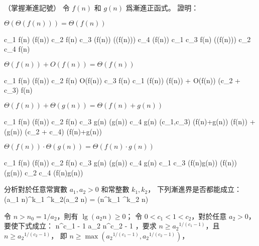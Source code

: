 \stopigBase
\stopPROBLEM

\startPROBLEM
（掌握漸進記號）
令 $f(n)$ 和 $g(n)$ 爲漸進正函式。
證明：
\startigBase[a]

\startitem
$\Theta(\Theta(f(n))) = \Theta(f(n))$

\startANSWER
\startformula\startmathalignment[n=3]
\NC c_1 f(n) \le \NC \Theta(f(n)) \NC \le c_2 f(n) \NR
\NC c_3 \Theta(f(n)) \le \NC \Theta(\Theta(f(n))) \NC \le c_4 \Theta(f(n)) \NR
\NC c_1 c_3 f(n) \le \NC \Theta(\Theta(f(n))) \NC \le c_2 c_4 f(n) \NR
\stopmathalignment\stopformula
\stopANSWER
\stopitem

\startitem
$\Theta(f(n)) + O(f(n)) = \Theta(f(n))$

\startANSWER
\startformula\startmathalignment[n=3]
\NC c_1 f(n) \le \NC \Theta(f(n)) \NC \le c_2 f(n) \NR
\NC \NC O(f(n)) \NC \le c_3 f(n) \NR
\NC c_1 \Theta(f(n)) \le \NC \Theta(f(n)) + O(f(n)) \NC \le (c_2 + c_3) f(n) \NR
\stopmathalignment\stopformula
\stopANSWER
\stopitem

\startitem
$\Theta(f(n)) + \Theta(g(n)) = \Theta(f(n)+g(n))$

\startANSWER
\startformula\startmathalignment[n=3]
\NC c_1 f(n) \le \NC \Theta(f(n)) \NC \le c_2 f(n) \NR
\NC c_3 g(n) \le \NC \Theta(g(n)) \NC \le c_4 g(n) \NR
\NC \min(c_1,c_3) (f(n)+g(n)) \le
	 \NC \Theta(f(n)) + \Theta(g(n))
	 \NC \le \max(c_2 + c_4) (f(n)+g(n)) \NR
\stopmathalignment\stopformula
\stopANSWER
\stopitem

\startitem
$\Theta(f(n)) \cdot \Theta(g(n)) = \Theta(f(n) \cdot g(n))$

\startANSWER
\startformula\startmathalignment[n=3]
\NC c_1 f(n) \le \NC \Theta(f(n)) \NC \le c_2 f(n) \NR
\NC c_3 g(n) \le \NC \Theta(g(n)) \NC \le c_4 g(n) \NR
\NC c_1 c_3 (f(n)\cdot g(n)) \le
	 \NC \Theta(f(n)) \cdot \Theta(g(n))
	 \NC \le c_2 c_4 (f(n)\cdot g(n)) \NR
\stopmathalignment\stopformula
\stopANSWER
\stopitem

\startitem
分析對於任意常實數 $a_1,a_2 > 0$ 和常整數 $k_1,k_2$，
下列漸進界是否都能成立：
\startformula
(a_1 n)^{k_1} \lg^{k_2}(a_2 n) = \Theta(n^{k_1} \lg^{k_2} n)
\stopformula

\startANSWER
令 $n>n_0=1/a_2$，則有 $\lg(a_2 n)\ge 0$；
令 $0 < c_1 < 1 < c_2$，對於任意 $a_2 > 0$，要使下式成立：
\startformula\startmathalignment[n=3,align={right,middle,left}]
\NC n^{c_1 - 1} \le \NC a_2 \NC \le n^{c_2 - 1} \NR
\stopmathalignment\stopformula
，要求 $n\ge {a_2}^{1/(c_1-1)}$，且 $n\ge {a_2}^{1/(c_2-1)}$，
即 $n \ge \max({a_2}^{1/(c_1-1)}, {a_2}^{1/(c_2-1)})$，

